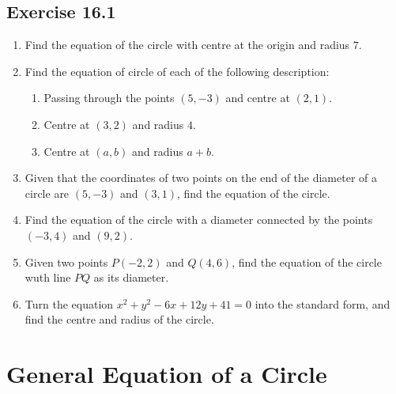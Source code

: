 \documentclass{report}
\begin{document}
\begin{multicols}{2}
    \subsection{Exercise 16.1}

    \begin{enumerate}
        \item Find the equation of the circle with centre at the origin and radius $7$.
        \item Find the equation of circle of each of the following description:
              \begin{enumerate}
                  \item Passing through the points $(5, -3)$ and centre at $(2, 1)$.
                  \item Centre at $(3, 2)$ and radius $4$.
                  \item Centre at $(a, b)$ and radius $a+b$.
              \end{enumerate}
        \item Given that the coordinates of two points on the end of the diameter of a circle
              are $(5, -3)$ and $(3, 1)$, find the equation of the circle.
        \item Find the equation of the circle with a diameter connected by the points $(-3,
                  4)$ and $(9, 2)$.
        \item Given two points $P(-2, 2)$ and $Q(4, 6)$, find the equation of the circle wuth
              line $PQ$ as its diameter.
        \item Turn the equation $x^2+y^2-6x+12y+41=0$ into the standard form, and find the
              centre and radius of the circle.
    \end{enumerate}

    \section{General Equation of a Circle}


\end{multicols}
\end{document}
